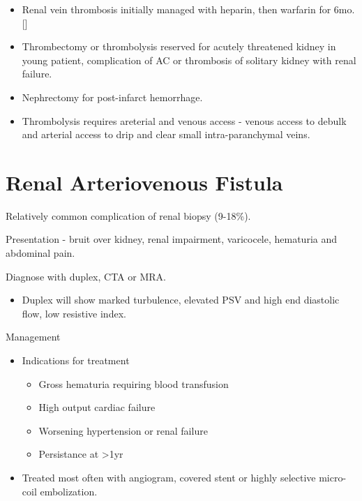 \documentclass[
]{book}
\providecommand{\tightlist}{%
  \setlength{\itemsep}{0pt}\setlength{\parskip}{0pt}}
\begin{document}
\begin{itemize}
\item
  Renal vein thrombosis initially managed with heparin, then warfarin
  for 6mo. {[}\citep{asgharRenalVeinThrombosis2007, velazquez-ramirez129RenovascularDisease2019}{]}
\item
  Thrombectomy or thrombolysis reserved for acutely threatened kidney
  in young patient, complication of AC or thrombosis of solitary
  kidney with renal failure.
\item
  Nephrectomy for post-infarct hemorrhage.
\item
  Thrombolysis requires areterial and venous access - venous access to
  debulk and arterial access to drip and clear small intra-paranchymal
  veins.
\end{itemize}

\hypertarget{renal-arteriovenous-fistula}{%
\section{Renal Arteriovenous Fistula}\label{renal-arteriovenous-fistula}}

Relatively common complication of renal biopsy (9-18\%).
\citep{schwarzCourseRelevanceArteriovenous2008}

Presentation - bruit over kidney, renal impairment, varicocele,
hematuria and abdominal pain. \citep{hunter174AcquiredArteriovenous2019}

Diagnose with duplex, CTA or MRA.

\begin{itemize}
\tightlist
\item
  Duplex will show marked turbulence, elevated PSV and high end
  diastolic flow, low resistive index.
  \citep{ozbekImagedirectedColorDoppler1995}
\end{itemize}

Management

\begin{itemize}
\item
  Indications for treatment \citep{merkusHighIncidenceArteriovenous2005, morimotoUniqueCaseRenovascular1995}

  \begin{itemize}
  \item
    Gross hematuria requiring blood transfusion
  \item
    High output cardiac failure
  \item
    Worsening hypertension or renal failure
  \item
    Persistance at \textgreater1yr
  \end{itemize}
\item
  Treated most often with angiogram, covered stent or highly selective
  micro-coil embolization. \citep{ginatTranscatheterRenalArtery2009, saliouIdiopathicRenalArteriovenous1998}
\end{itemize}
\end{document}
